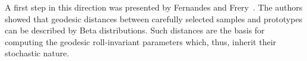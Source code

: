 \documentclass[journal]{IEEEtran}
\begin{document}
	A first step in this direction was presented by Fernandes and Frery~\cite{StatisticalPropertiesofGeodesicDistancesBetweenSamplesandElementaryScatterersinPolSARImagery2019}.
	The authors showed that geodesic distances between carefully selected samples and prototypes can be described by Beta distributions.
	Such distances are the basis for computing the geodesic roll-invariant parameters which, thus, inherit their stochastic nature.
	
\end{document}
